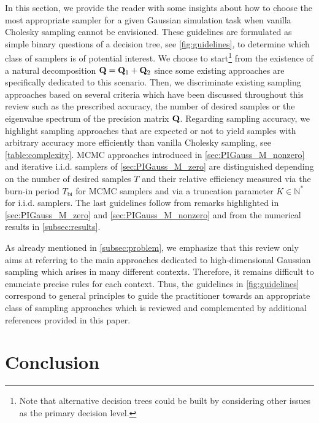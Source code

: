 \documentclass[nohypdvips,onefignum,onetabnum]{siamart171218}
\begin{document}
In this section, we provide the reader with some insights about how to choose the most appropriate sampler for a given Gaussian simulation task when vanilla Cholesky sampling cannot be envisioned.
These guidelines are formulated as simple binary questions of a decision tree, see \cref{fig:guidelines}, to determine which class of samplers is of potential interest. 
We choose to start\footnote{Note that alternative decision trees could be built by considering other issues as the primary decision level.} from the existence of a natural decomposition $\mathbf{Q} = \mathbf{Q}_1 + \mathbf{Q}_2$ since some existing approaches are specifically dedicated to this scenario.
Then, we discriminate existing sampling approaches based on several criteria which have been discussed throughout this review such as the prescribed accuracy, the number of desired samples or the eigenvalue spectrum of the precision matrix $\mathbf{Q}$.
Regarding sampling accuracy, we highlight sampling approaches that are expected or not to yield samples with arbitrary accuracy more efficiently than vanilla Cholesky sampling, see \cref{table:complexity}.
MCMC approaches introduced in \cref{sec:PIGauss_M_nonzero} and iterative i.i.d. samplers of \cref{sec:PIGauss_M_zero} are distinguished depending on the number of desired samples $T$ and their relative efficiency measured via the burn-in period $T_{\mathrm{bi}}$ for MCMC samplers and via a truncation parameter $K \in \mathbb{N}^*$ for i.i.d. samplers.
The last guidelines follow from remarks highlighted in \cref{sec:PIGauss_M_zero} and \cref{sec:PIGauss_M_nonzero} and from the numerical results in \cref{subsec:results}.

As already mentioned in \cref{subsec:problem}, we emphasize that this review only aims at referring to the main approaches dedicated to high-dimensional Gaussian sampling which arises in many different contexts.
Therefore, it remains difficult to enunciate precise rules for each context. Thus, the guidelines in \cref{fig:guidelines} correspond to general principles to guide the  practitioner towards an appropriate class of sampling approaches which is reviewed and complemented by additional references provided in this paper. 

\section{Conclusion}
\label{sec:conclusion}
\end{document}
